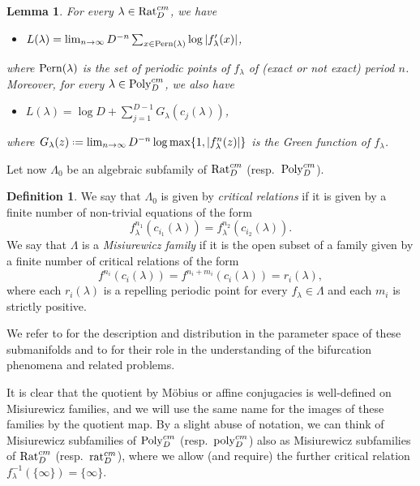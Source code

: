 \documentclass[11pt]{amsart}
\theoremstyle{plain}
\newtheorem{lem}[thm]{Lemma}
\theoremstyle{definition}
\newtheorem{defn}[thm]{Definition}
\theoremstyle{remark}
\newcommand*{\defeq}{\mathrel{\vcenter{\baselineskip0.5ex \lineskiplimit0pt
			\hbox{\scriptsize.}\hbox{\scriptsize.}}}%
	=}
\begin{document}
\begin{lem}\label{lem:lyap}
For every $\lambda \in {\rm Rat}^{cm}_D$, we have
\begin{itemize}
\item[{\it (1)}] 
$L(\lambda) =\lim_{n\to \infty} D^{-n}
\sum_{x \in {\rm Pern}(\lambda)} \log |f'_\lambda (x)|$,
\end{itemize}
where ${\rm Pern}(\lambda)$ is the set of 
periodic points of $f_\lambda$ of
(exact or not exact) 
period $n$. 
Moreover, for every $\lambda \in {\rm Poly}^{cm}_D$, we 
also have
\begin{itemize}
\item[{\it (2)}] 
$L(\lambda)= \log D + \sum_{j=1}^{D-1} G_\lambda (c_j (\lambda))$,
\end{itemize}
where $G_\lambda(z) \defeq \lim_{n \to \infty} D^{-n}
\log \max\{1, |f^n_\lambda(z)|\}$ is the
\emph{Green function}
of $f_\lambda$.
\end{lem}


Let now $\Lambda_0$ be an algebraic subfamily of ${\rm Rat}^{cm}_D$ (resp.\ ${\rm Poly}^{cm}_D$).

\begin{defn}
We say that $\Lambda_0$ is given by
\emph{critical relations}  if it is given by a finite number of non-trivial
equations of
the form
\[
f^{n_1}_\lambda 
(c_{i_1}(\lambda)) 
= f^{n_2}_\lambda (c_{i_2}(\lambda)).
\]
We say that $\Lambda$
is a 
\emph{Misiurewicz family}
if it is the open subset of a 
family given by a finite number of 
critical relations of the form
\[
f^{n_i} (c_{i} (\lambda)) = f^{n_i+m_i} (c_{i}(\lambda)) = r_{i}(\lambda),
\]
where each $r_{i}(\lambda)$ is a repelling periodic point for every $f_\lambda\in \Lambda$
and each $m_i$ is strictly positive.
\end{defn}

We refer to 
\cite{BB09,BB11,demarco01,Dujardin14,DujardinFavre08,GOV19,Okuyama14}
for the description and
distribution in the parameter space  of these submanifolds 
and 
to
\cite{Berteloot13, BBD18, B19, Dujardin14, Levin82}
for their role in the
understanding of the bifurcation phenomena and related problems.

\medskip



 It is clear that the quotient by 
  M\"obius or
 affine conjugacies is well-defined on Misiurewicz families, and we will use the same name for the images of these families by the quotient map.
By a slight abuse of notation, we can think of Misiurewicz subfamilies of ${\rm Poly}_D^{cm}$ (resp.\ ${\rm poly}_D^{cm}$) also as Misiurewicz subfamilies of ${\rm Rat}_D^{cm}$ (resp.\ ${\rm rat}_D^{cm}$), where we allow (and require) the further critical relation
$f_\lambda^{-1} (\{\infty\})=\{\infty\}$.
\end{document}
